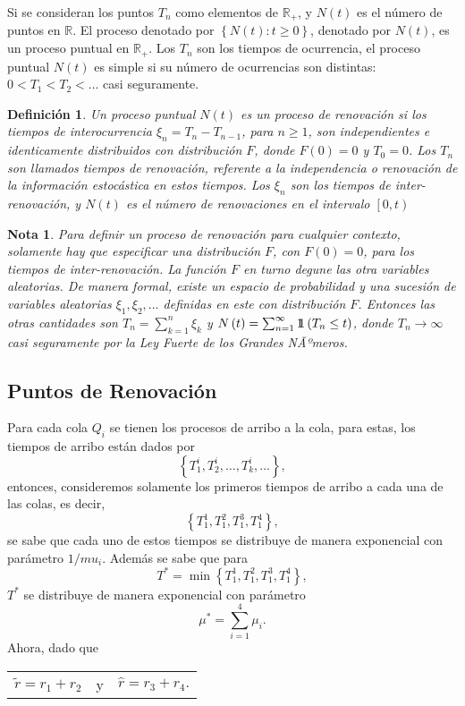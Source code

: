 \documentclass{article}
\newtheorem{Def}{Definición}
\newtheorem{Note}{Nota}
\newcommand{\rea}{\mathbb{R}}
\newcommand{\indora}{\mbox{$1$\hspace{-0.8ex}$1$}}
\begin{document}
Si se consideran los puntos $T_{n}$ como elementos de $\rea_{+}$, y $N\left(t\right)$ es el n\'umero de puntos en $\rea$. El proceso denotado por $\left\{N\left(t\right):t\geq0\right\}$, denotado por $N\left(t\right)$, es un proceso puntual en $\rea_{+}$. Los $T_{n}$ son los tiempos de ocurrencia, el proceso puntual $N\left(t\right)$ es simple si su n\'umero de ocurrencias son distintas: $0<T_{1}<T_{2}<\ldots$ casi seguramente.

\begin{Def}
Un proceso puntual $N\left(t\right)$ es un proceso de renovaci\'on si los tiempos de interocurrencia $\xi_{n}=T_{n}-T_{n-1}$, para $n\geq1$, son independientes e identicamente distribuidos con distribuci\'on $F$, donde $F\left(0\right)=0$ y $T_{0}=0$. Los $T_{n}$ son llamados tiempos de renovaci\'on, referente a la independencia o renovaci\'on de la informaci\'on estoc\'astica en estos tiempos. Los $\xi_{n}$ son los tiempos de inter-renovaci\'on, y $N\left(t\right)$ es el n\'umero de renovaciones en el intervalo $\left[0,t\right)$
\end{Def}


\begin{Note}
Para definir un proceso de renovaci\'on para cualquier contexto, solamente hay que especificar una distribuci\'on $F$, con $F\left(0\right)=0$, para los tiempos de inter-renovaci\'on. La funci\'on $F$ en turno degune las otra variables aleatorias. De manera formal, existe un espacio de probabilidad y una sucesi\'on de variables aleatorias $\xi_{1},\xi_{2},\ldots$ definidas en este con distribuci\'on $F$. Entonces las otras cantidades son $T_{n}=\sum_{k=1}^{n}\xi_{k}$ y $N\left(t\right)=\sum_{n=1}^{\infty}\indora\left(T_{n}\leq t\right)$, donde $T_{n}\rightarrow\infty$ casi seguramente por la Ley Fuerte de los Grandes NÃºmeros.
\end{Note}
\subsection{Puntos de Renovaci\'on}

Para cada cola $Q_{i}$ se tienen los procesos de arribo a la cola, para estas, los tiempos de arribo est\'an dados por $$\left\{T_{1}^{i},T_{2}^{i},\ldots,T_{k}^{i},\ldots\right\},$$ entonces, consideremos solamente los primeros tiempos de arribo a cada una de las colas, es decir, $$\left\{T_{1}^{1},T_{1}^{2},T_{1}^{3},T_{1}^{4}\right\},$$ se sabe que cada uno de estos tiempos se distribuye de manera exponencial con par\'ametro $1/mu_{i}$. Adem\'as se sabe que para $$T^{*}=\min\left\{T_{1}^{1},T_{1}^{2},T_{1}^{3},T_{1}^{4}\right\},$$ $T^{*}$ se distribuye de manera exponencial con par\'ametro $$\mu^{*}=\sum_{i=1}^{4}\mu_{i}.$$ Ahora, dado que 
\begin{center}
\begin{tabular}{lcl}
$\tilde{r}=r_{1}+r_{2}$ & y &$\hat{r}=r_{3}+r_{4}.$
\end{tabular}
\end{center}
\end{document}
